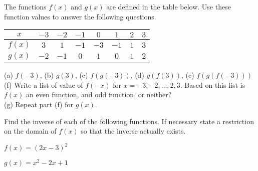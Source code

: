 \begin{exercises} 

\item The functions $f(x)$ and $g(x)$ are defined in the table below.  Use these function
    values to answer the following questions.
    \begin{center}
        \begin{tabular}[h!]{|c||c|c|c|c|c|c|c|}
            \hline
            $x$   & $-3$ &$-2$ &$-1$ &$ 0$ &$ 1$ &$ 2$ & $3$ \\ \hline \hline
            $f(x)$& $ 3$ &$ 1$ &$-1$ &$-3$ &$-1$ &$ 1$ & $3$\\ \hline
            $g(x)$& $-2$ &$-1$ &$ 0$ &$ 1$ &$ 0$ &$ 1$ & $2$\\ \hline
        \end{tabular}
    \end{center}
        (a) $f(-3)$, \quad (b) $g(3)$, \quad (c) $f(g(-3))$, \quad (d) $g(f(3))$, \quad
        (e) $f(g(f(-3)))$ \\
        (f) Write a list of value of $f(-x)$ for $x = -3, -2, \dots, 2, 3$.  Based on
            this list is $f(x)$ an even function, and odd function, or neither?\\
        (g) Repeat part (f) for $g(x)$.
\begin{exerciseSolution}
\end{exerciseSolution}


\item Find the inverse of each of the following functions.  If necessary state a
    restriction on the domain of $f(x)$ so that the inverse actually exists.
    \ba
        \item $f(x) = (2x-3)^2$
        \item $g(x) = x^2 - 2x + 1$
    \ea
\begin{exerciseSolution}
\end{exerciseSolution}



\end{exercises}
